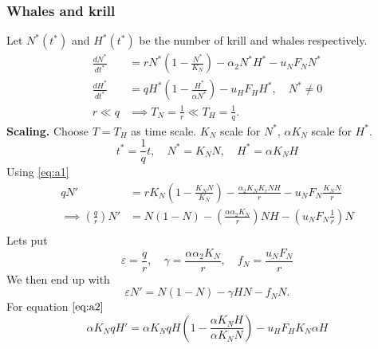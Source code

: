 \documentclass{article}
\theoremstyle{remark}
\begin{document}
  \subsubsection{Whales and krill}%
  \label{ssub:whales_and_krill}
  Let $N^{*}\left( t^{*} \right) $ and $H^{*}\left( t^{*} \right)$ be the number of krill and whales respectively.  
  \begin{align}
    \label{eq:a1}
  \frac{d N^{*}}{d t^{*}}   & = rN^{*}\left( 1- \frac{N^{*}}{K_{N}}  \right) - \alpha _{2} N^{*}H^{*} - u_{N}F_{N} N^{*} \\
    \label{eq:a2}
  \frac{d H^{*}}{d t^{*}}  &=  q H^{*} \left( 1- \frac{H^{*}}{\alpha  N^{*}}  \right) - u_{H} F_{H} H^{*} , \quad  N^{*} \neq 0  \\
  r \ll  q  & \implies  T_{N} = \frac{1}{r} \ll  T_{H} = \frac{1}{q} 
  .\end{align}
  \textbf{Scaling.}  Choose $T = T_{H} $ as time scale. $K_{N}$ scale for $N^{*}$, $\alpha K_{N}$ scale for $H^{*}$. \[
  t^{*} = \frac{1}{q} t, \quad  N^{*} =  K_{N} N , \quad  H^{*} = \alpha  K_{N} H  
  \]  
  Using \eqref{eq:a1}    \[
    \begin{split}
  qN'   & = rK_{N} \left( 1- \frac{K_{N} N}{K_{N}}  \right) - \frac{\alpha _{2} K_{N}K_{r} NH}{r} - u_{N} F_{N} \frac{K_{N} N}{ r}    \\
  \implies  \left( \frac{q}{r} \right) N'  &=  N \left( 1 - N \right) - \left( \frac{\alpha \alpha _{2} K_{N}}{r}  \right) NH - \left( u_{N} F_{N} \frac{1}{r}  \right)N \\
    \end{split} 
  \] 
  Lets put \[
  \varepsilon  = \frac{q}{r} , \quad  \gamma  = \frac{\alpha \alpha _{2} K_{N}}{r}, \quad  f_{N} = \frac{u_{N} F_{N}}{r}   
  \] 
  We then end up with
  \[
    \varepsilon  N'  = N\left( 1- N \right) - \gamma  HN - f_{N} N
  .
  \] 
  For equation $\eqref{eq:a2} $ \[
  \alpha K_{N} q H'  = \alpha  K_{N} q H \left( 1 - \frac{\alpha  K_{N} H }{ \alpha  K_{N} N}  \right) - u_{H} F_{H} K_{N} \alpha H
  \] 
\end{document}
